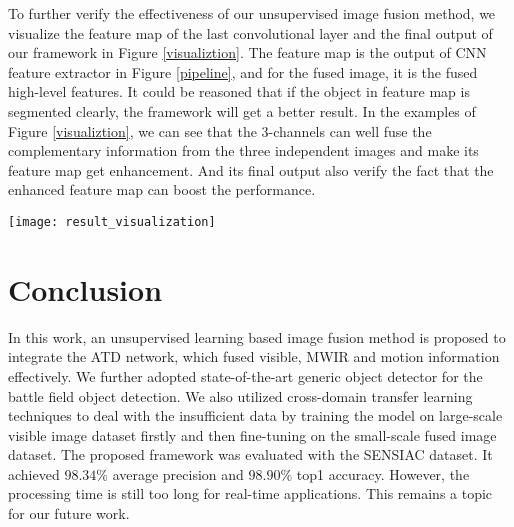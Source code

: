 \documentclass[journal]{IEEEtran}
\begin{document}
To further verify the effectiveness of our unsupervised image fusion method, we visualize the feature map of the last convolutional layer and the final output of our framework in Figure \ref{visualiztion}. The feature map is the output of CNN feature extractor in Figure \ref{pipeline}, and for the fused image, it is the fused high-level features. It could be reasoned that if the object in feature map is segmented clearly, the framework will get a better result. In the examples of Figure \ref{visualiztion}, we can see that the 3-channels can well fuse the complementary information from the three independent images and make its feature map get enhancement. And its final output also verify the fact that the enhanced feature map can boost the performance.
\begin{figure*}[ph]
\centering
\texttt{[image: result\_visualization]}
\caption{Example visualizing results of our framework. Example 1 and 2 demonstrate the performance of different type of inputs in system on large and small object detection, respectively. Different columns denote different types of input image. The raw input image, generated feature map and the final output are showed in consecutive rows. In the final output image, the green bounding box represent the position of object predicted by system. }
\label{visualiztion}
\end{figure*}


\section{Conclusion}

In this work, an unsupervised learning based image fusion method is proposed to integrate the ATD network, which fused visible, MWIR and motion information effectively. We further adopted state-of-the-art generic object detector for the battle field object detection. We also utilized cross-domain transfer learning techniques to deal with the insufficient data by training the model on large-scale visible image dataset firstly and then fine-tuning on the small-scale fused image dataset. The proposed framework was evaluated with the SENSIAC dataset. It achieved $98.34\%$ average precision and $98.90\%$ top1 accuracy. However, the processing time is still too long for real-time applications. This remains a topic for our future work. 
















\ %
\end{document}
